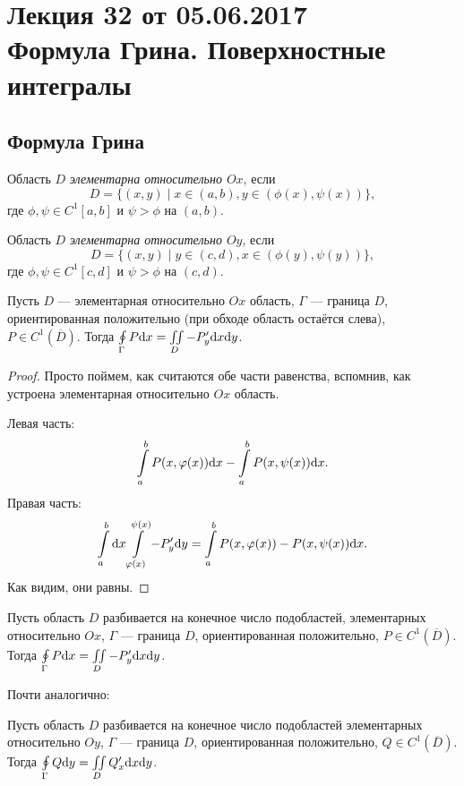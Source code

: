 \section{Лекция 32 от 05.06.2017 \\ Формула Грина. Поверхностные интегралы}
\subsection{Формула Грина}
\begin{Def}
Область $D$ \textit{элементарна относительно $Ox$}, если 
$$D = \{ (x, y) \mid x \in (a, b), y \in (\phi(x), \psi(x)) \},$$
где $\phi, \psi \in C^{1}[a, b]$ и $\psi > \phi$ на $(a, b)$.
\end{Def}
\begin{Def}
Область $D$ \textit{элементарна относительно $Oy$}, если 
$$D = \{ (x, y) \mid y \in (c, d), x \in (\phi(y), \psi(y)) \},$$
где $\phi, \psi \in C^{1}[c, d]$ и $\psi > \phi$ на $(c, d)$.
\end{Def}

\begin{Lemma}
Пусть $D$ --- элементарная относительно $Ox$ область, $\Gamma$ --- граница $D$, ориентированная положительно (при обходе область остаётся слева), $P \in C^1(\overline{D})$. Тогда $\oint\limits_\Gamma P\mathrm{d}x = \iint\limits_D - P'_y\mathrm{d}x \mathrm{d} y$.
\end{Lemma}
\begin{proof}
Просто поймем, как считаются обе части равенства, вспомнив, как устроена элементарная относительно $Ox$ область.

Левая часть:
$$
\int\limits_a^b P(x,\varphi(x))\mathrm{d}x - \int\limits_a^bP(x, \psi(x))\mathrm{d}x.
$$
Правая часть:
$$
\int\limits_a^b\mathrm{d}x\int\limits_{\varphi(x)}^{\psi(x)} -P'_y\mathrm{d} y = \int\limits_a^bP(x, \varphi(x)) - P(x, \psi(x))\mathrm{d}x.
$$
Как видим, они равны.
\end{proof}

\begin{Consequence}
Пусть область $D$ разбивается на конечное число подобластей, элементарных относительно  $Ox$, $\Gamma$ --- граница $D$, ориентированная положительно, $P \in C^1(\overline{D})$. Тогда $\oint\limits_\Gamma P\mathrm{d}x = \iint\limits_D - P'_y\mathrm{d}x \mathrm{d} y$.
\end{Consequence}

Почти аналогично:
\begin{Consequence}
Пусть область $D$ разбивается на конечное число подобластей элементарных относительно  $Oy$, $\Gamma$ --- граница $D$, ориентированная положительно, $Q \in C^1(\overline{D})$. Тогда $\oint\limits_\Gamma Q\mathrm{d} y = \iint\limits_D Q'_x\mathrm{d}x \mathrm{d} y$.
\end{Consequence}

